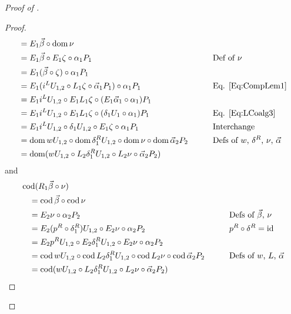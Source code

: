 \begin{proof}[Proof of ]
\begin{proof}
\begin{alignat*}{2}
			&= E_1\vec{\beta} \circ \operatorname{dom}\nu && \\
			&= E_1\vec{\beta} \circ E_1\zeta \circ \alpha_1P_1
				&& \text{Def of $\nu$} \\
			&= E_1(\vec{\beta}\circ\zeta) \circ \alpha_1P_1 && \\
			&= E_1(i^LU_{1,2} \circ L_1\zeta \circ \vec{\alpha}_1P_1) \circ \alpha_1P_1
				&& \text{Eq. \eqref{Eq:CompLem1}} \\
			&= E_1i^LU_{1,2} \circ E_1L_1\zeta \circ (E_1\vec{\alpha}_1\circ\alpha_1)P_1 && \\
			&= E_1i^LU_{1,2} \circ E_1L_1\zeta \circ (\delta_1U_1\circ\alpha_1)P_1
				&& \text{Eq. \eqref{Eq:LCoalg3}} \\
			&= E_1i^LU_{1,2} \circ \delta_1U_{1,2} \circ E_1\zeta \circ \alpha_1P_1
				&& \text{Interchange} \\
			&= \operatorname{dom} wU_{1,2} \circ \operatorname{dom}\delta_1^RU_{1,2} \circ \operatorname{dom}\nu \circ \operatorname{dom}\vec{\alpha}_2P_2
				&\qquad& \text{Defs of $w$, $\delta^R$, $\nu$, $\vec{\alpha}$} \\
			&= \operatorname{dom} (wU_{1,2} \circ L_2\delta_1^RU_{1,2} \circ L_2\nu \circ \vec{\alpha}_2P_2)
		\end{alignat*}
		and
		\begin{alignat*}{2}
			\hspace{1em}&\hspace{-1em} \operatorname{cod}(R_1\vec{\beta} \circ \nu) && \\
			&= \operatorname{cod}\vec{\beta} \circ \operatorname{cod}\nu && \\
			&= E_2\nu \circ \alpha_2P_2
				&& \text{Defs of $\vec{\beta}$, $\nu$} \\
			&= E_2(p^R\circ\delta_1^R)U_{1,2} \circ E_2\nu \circ \alpha_2P_2
				&& p^R\circ\delta^R = \operatorname{id} \\
			&= E_2p^RU_{1,2} \circ E_2\delta_1^RU_{1,2} \circ E_2\nu \circ \alpha_2P_2 && \\
			&= \operatorname{cod} wU_{1,2} \circ \operatorname{cod} L_2\delta_1^RU_{1,2} \circ \operatorname{cod} L_2\nu \circ \operatorname{cod}\vec{\alpha}_2P_2
				&\qquad& \text{Defs of $w$, $L$, $\vec{\alpha}$} \\
			&= \operatorname{cod}(wU_{1,2} \circ L_2\delta_1^RU_{1,2} \circ L_2\nu \circ \vec{\alpha}_2P_2)
		\end{alignat*}
	\end{proof}


\end{proof}
